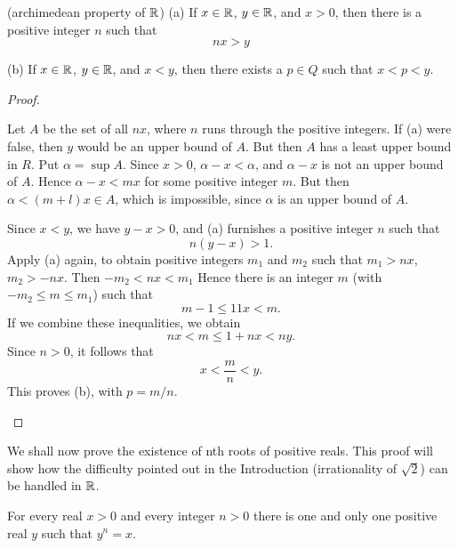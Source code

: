 \begin{thm}\label{thm:1.20}(archimedean property of ${\protect\mathbb R}$)
    (a) If $x \in {\protect\mathbb R}$, $y \in {\protect\mathbb R}$, and $x > 0$, then there is a positive integer $n$ such that
    \begin{equation*}
        nx > y
    \end{equation*}

    (b) If $x \in {\protect\mathbb R}$, $y \in {\protect\mathbb R}$, and $x < y$, then there exists a $p \in Q$ such that $x < p < y$.
\end{thm}
\begin{proof}
    \begin{asparaenum}[(a)]
        \item Let $A$ be the set of all $nx$, 
        where $n$ runs through the positive integers.
        If (a) were false, then $y$ would be an upper bound of $A$. 
        But then $A$ has a least upper bound in $R$. 
        Put $\alpha = \sup A$. 
        Since $x > 0$, $\alpha - x < \alpha$, 
        and $\alpha - x$ is not an upper bound of $A$. 
        Hence $\alpha - x < mx$ for some positive integer $m$. 
        But then $\alpha < (m + l)x \in A$, 
        which is impossible, 
        since $\alpha$ is an upper bound of $A$.
        \item Since $x < y$, we have $y - x > $0, 
        and (a) furnishes a positive integer $n$ 
        such that
        \begin{equation*}
            n(y - x) > 1.
        \end{equation*}
        Apply (a) again, to obtain positive integers $m_1$ and $m_2$ 
        such that $m_1 > nx$,
        $m_2 > -nx$. Then
        $-m_2 < nx < m_1$
        Hence there is an integer $m$ (with $-m_2 \leq m \leq m_1$) 
        such that
        \begin{equation*}
            m - 1\leq 11x < m.
        \end{equation*}
        If we combine these inequalities, we obtain
        \begin{equation*}
            nx < m \leq 1 + nx < ny.
        \end{equation*}
        Since $n > 0$, it follows that
        \begin{equation*}
            x < \frac{m}{n} < y.
        \end{equation*}
        This proves (b), with $p = m/n$.
    \end{asparaenum}
\end{proof}

We shall now prove the existence of nth roots of positive reals. 
This proof will show how the difficulty pointed out in the Introduction 
(irrationality of $\sqrt{2}$) can be handled in ${\protect\mathbb R}$.
\begin{thm}
    \label{thm:1.21}
    For every real $x > 0$ and every integer $n> 0$ 
    there is one and only one positive real $y$ 
    such that $y^n = x$.
\end{thm}

